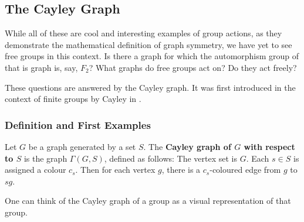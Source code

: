 \subsection{The Cayley Graph}

While all of these are cool and interesting examples of group actions, as they demonstrate the mathematical definition of graph symmetry, we have yet to see free groups in this context. Is there a graph for which the automorphism group of that is graph is, say, $F_2$? What graphs do free groups act on? Do they act freely? 

These questions are answered by the Cayley graph. It was first introduced in the context of finite groups by Cayley in \cite{Cayley1878}.

\subsubsection{Definition and First Examples}

\begin{defn}
    Let $G$ be a graph generated by a set $S$. The \textbf{Cayley graph of $G$ with respect to $S$} is the graph $\Gamma(G,S)$, defined as follows: The vertex set is $G$. Each $s \in S$ is assigned a colour $c_s$. Then for each vertex $g$, there is a $c_s$-coloured edge from $g$ to $sg$. 
\end{defn}

One can think of the Cayley graph of a group as a visual representation of that group.

